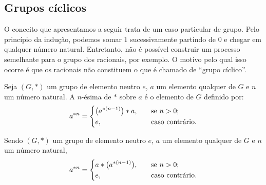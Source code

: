 \subsection{Grupos cíclicos}

O conceito que apresentamos a seguir trata de um caso particular de
grupo. Pelo princípio da indução, podemos somar $1$ sucessivamente
partindo de $0$ e chegar em qualquer número natural. Entretanto, não é
possível construir um processo semelhante para o grupo dos racionais,
por exemplo. O motivo pelo qual isso ocorre é que os racionais não
constituem o que é chamado de ``grupo cíclico''.

\begin{Def}\label{defiteracao}
  Seja $(G,\ast)$ um grupo de elemento neutro $e$,
  $a$ um elemento qualquer de $G$ e
  $n$ um número natural. A $n$-ésima  de $\ast$ sobre $a$ é o elemento de $G$ definido por:
  \begin{equation*}
    \simb[$n$-ésima iteração de $\ast$ sobre $a$]{a^{\ast n}} = \left\{
    \begin{aligned}
      &\bigl(a^{\ast(n-1)}\bigr)\ast a\MMv&\quad&\text{se $n>0$;}\\
      &e\MMv&\quad&\text{caso contrário.}
    \end{aligned}
    \right.
  \end{equation*}
\end{Def}

\begin{Propr}\label{proprpotalternativa}
  Sendo  $(G,\ast)$ um grupo de elemento neutro $e$,
  $a$ um elemento qualquer de $G$ e
  $n$ um número natural,
  \begin{equation*}
    a^{\ast n} = \left\{
    \begin{aligned}
      &a\ast \bigl(a^{\ast(n-1)}\bigr)\mathrm{,}&\quad&\text{se $n>0$;}\\
      &e\mathrm{,}&\quad&\text{caso contrário.}
    \end{aligned}
    \right.
  \end{equation*}
\end{Propr}


